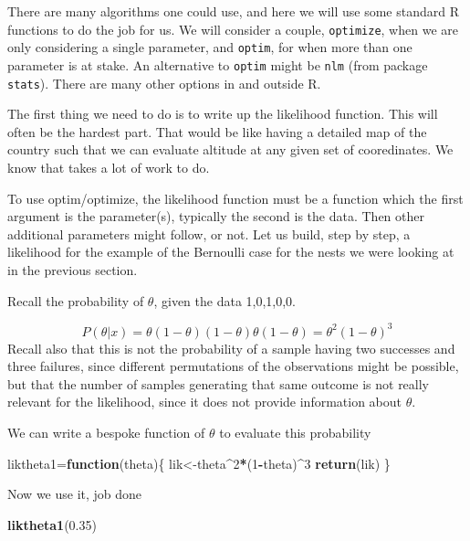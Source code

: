 \documentclass[
]{book}
\newenvironment{Shaded}{\begin{snugshade}}{\end{snugshade}}
\newcommand{\ControlFlowTok}[1]{\textcolor[rgb]{0.13,0.29,0.53}{\textbf{#1}}}
\newcommand{\DecValTok}[1]{\textcolor[rgb]{0.00,0.00,0.81}{#1}}
\newcommand{\FloatTok}[1]{\textcolor[rgb]{0.00,0.00,0.81}{#1}}
\newcommand{\FunctionTok}[1]{\textcolor[rgb]{0.13,0.29,0.53}{\textbf{#1}}}
\newcommand{\NormalTok}[1]{#1}
\newcommand{\OtherTok}[1]{\textcolor[rgb]{0.56,0.35,0.01}{#1}}
\newcommand{\SpecialCharTok}[1]{\textcolor[rgb]{0.81,0.36,0.00}{\textbf{#1}}}
\begin{document}
There are many algorithms one could use, and here we will use some standard R functions to do the job for us. We will consider a couple, \texttt{optimize}, when we are only considering a single parameter, and \texttt{optim}, for when more than one parameter is at stake. An alternative to \texttt{optim} might be \texttt{nlm} (from package \texttt{stats}). There are many other options in and outside R.

The first thing we need to do is to write up the likelihood function. This will often be the hardest part. That would be like having a detailed map of the country such that we can evaluate altitude at any given set of cooredinates. We know that takes a lot of work to do.

To use optim/optimize, the likelihood function must be a function which the first argument is the parameter(s), typically the second is the data. Then other additional parameters might follow, or not. Let us build, step by step, a likelihood for the example of the Bernoulli case for the nests we were looking at in the previous section.

Recall the probability of \(\theta\), given the data 1,0,1,0,0.

\[P(\theta|x)=\theta (1-\theta) (1-\theta) \theta (1-\theta)=\theta^2 (1-\theta)^3\]
Recall also that this is not the probability of a sample having two successes and three failures, since different permutations of the observations might be possible, but that the number of samples generating that same outcome is not really relevant for the likelihood, since it does not provide information about \(\theta\).

We can write a bespoke function of \(\theta\) to evaluate this probability

\begin{Shaded}
\begin{Highlighting}[]
\NormalTok{liktheta1}\OtherTok{=}\ControlFlowTok{function}\NormalTok{(theta)\{}
\NormalTok{  lik}\OtherTok{\textless{}{-}}\NormalTok{theta}\SpecialCharTok{\^{}}\DecValTok{2}\SpecialCharTok{*}\NormalTok{(}\DecValTok{1}\SpecialCharTok{{-}}\NormalTok{theta)}\SpecialCharTok{\^{}}\DecValTok{3}
  \FunctionTok{return}\NormalTok{(lik)}
\NormalTok{\}}
\end{Highlighting}
\end{Shaded}

Now we use it, job done

\begin{Shaded}
\begin{Highlighting}[]
\FunctionTok{liktheta1}\NormalTok{(}\FloatTok{0.35}\NormalTok{)}
\end{Highlighting}
\end{Shaded}
\end{document}
